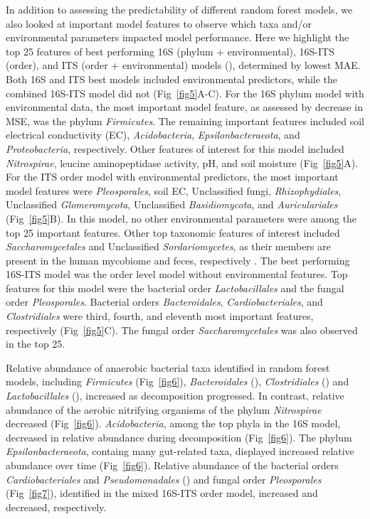 \documentclass[
  10pt,
  letterpaper,
]{article}
\begin{document}
In addition to assessing the predictability of different random forest
models, we also looked at important model features to observe which taxa
and/or environmental parameters impacted model performance. Here we
highlight the top 25 features of best performing 16S (phylum +
environmental), 16S-ITS (order), and ITS (order + environmental) models
(), determined by lowest MAE. Both 16S and ITS
best models included environmental predictors, while the combined
16S-ITS model did not (Fig~\ref{fig5}A-C). For the 16S phylum model with
environmental data, the most important model feature, as assessed by
decrease in MSE, was the phylum \emph{Firmicutes}. The remaining
important features included soil electrical conductivity (EC),
\emph{Acidobacteria}, \emph{Epsilonbacteraeota}, and
\emph{Proteobacteria}, respectively. Other features of interest for this
model included \emph{Nitrospirae}, leucine aminopeptidase activity, pH,
and soil moisture (Fig~\ref{fig5}A). For the ITS order model with
environmental predictors, the most important model features were
\emph{Pleosporales}, soil EC, Unclassified fungi, \emph{Rhizophydiales},
Unclassified \emph{Glomeromycota}, Unclassified \emph{Basidiomycota},
and \emph{Auriculariales} (Fig~\ref{fig5}B). In this model, no other
environmental parameters were among the top 25 important features. Other
top taxonomic features of interest included \emph{Saccharomycetales} and
Unclassified \emph{Sordariomycetes}, as their members are present in the
human mycobiome and feces, respectively
\citep{blackwell_fungi_2004, taylor_ascomycota_2015}. The best
performing 16S-ITS model was the order level model without environmental
features. Top features for this model were the bacterial order
\emph{Lactobacillales} and the fungal order \emph{Pleosporales}.
Bacterial orders \emph{Bacteroidales}, \emph{Cardiobacteriales}, and
\emph{Clostridiales} were third, fourth, and eleventh most important
features, respectively (Fig~\ref{fig5}C). The fungal order
\emph{Saccharomycetales} was also observed in the top 25.

Relative abundance of anaerobic bacterial taxa identified in random
forest models, including \emph{Firmicutes} (Fig~\ref{fig6}),
\emph{Bacteroidales} (), \emph{Clostridiales}
() and \emph{Lactobacillales} (),
increased as decomposition progressed. In contrast, relative abundance
of the aerobic nitrifying organisms of the phylum \emph{Nitrospirae}
decreased (Fig~\ref{fig6}). \emph{Acidobacteria}, among the top phyla in
the 16S model, decreased in relative abundance during decomposition
(Fig~\ref{fig6}). The phylum \emph{Epsilonbacteraeota}, containg many
gut-related taxa, displayed increased relative abundance over time
(Fig~\ref{fig6}). Relative abundance of the bacterial orders
\emph{Cardiobacteriales} and \emph{Pseudomonadales} ()
and fungal order \emph{Pleosporales} (Fig~\ref{fig7}), identified in the
mixed 16S-ITS order model, increased and decreased, respectively.
\end{document}
